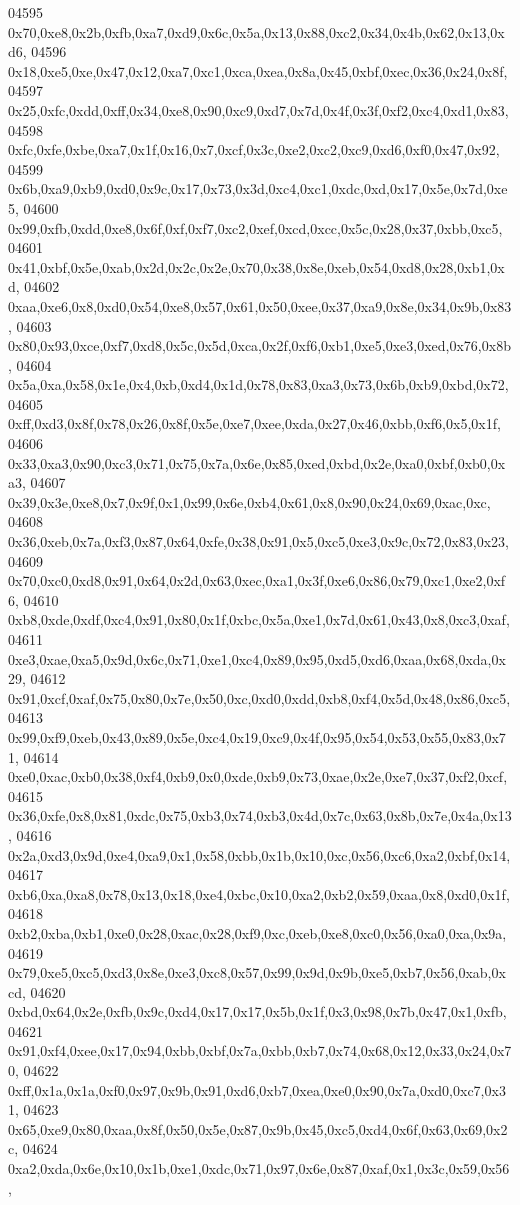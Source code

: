 \begin{DoxyCode}
04595   0x70,0xe8,0x2b,0xfb,0xa7,0xd9,0x6c,0x5a,0x13,0x88,0xc2,0x34,0x4b,0x62,0x13,0xd6,
04596   0x18,0xe5,0xe,0x47,0x12,0xa7,0xc1,0xca,0xea,0x8a,0x45,0xbf,0xec,0x36,0x24,0x8f,
04597   0x25,0xfc,0xdd,0xff,0x34,0xe8,0x90,0xc9,0xd7,0x7d,0x4f,0x3f,0xf2,0xc4,0xd1,0x83,
04598   0xfc,0xfe,0xbe,0xa7,0x1f,0x16,0x7,0xcf,0x3c,0xe2,0xc2,0xc9,0xd6,0xf0,0x47,0x92,
04599   0x6b,0xa9,0xb9,0xd0,0x9c,0x17,0x73,0x3d,0xc4,0xc1,0xdc,0xd,0x17,0x5e,0x7d,0xe5,
04600   0x99,0xfb,0xdd,0xe8,0x6f,0xf,0xf7,0xc2,0xef,0xcd,0xcc,0x5c,0x28,0x37,0xbb,0xc5,
04601   0x41,0xbf,0x5e,0xab,0x2d,0x2c,0x2e,0x70,0x38,0x8e,0xeb,0x54,0xd8,0x28,0xb1,0xd,
04602   0xaa,0xe6,0x8,0xd0,0x54,0xe8,0x57,0x61,0x50,0xee,0x37,0xa9,0x8e,0x34,0x9b,0x83,
04603   0x80,0x93,0xce,0xf7,0xd8,0x5c,0x5d,0xca,0x2f,0xf6,0xb1,0xe5,0xe3,0xed,0x76,0x8b,
04604   0x5a,0xa,0x58,0x1e,0x4,0xb,0xd4,0x1d,0x78,0x83,0xa3,0x73,0x6b,0xb9,0xbd,0x72,
04605   0xff,0xd3,0x8f,0x78,0x26,0x8f,0x5e,0xe7,0xee,0xda,0x27,0x46,0xbb,0xf6,0x5,0x1f,
04606   0x33,0xa3,0x90,0xc3,0x71,0x75,0x7a,0x6e,0x85,0xed,0xbd,0x2e,0xa0,0xbf,0xb0,0xa3,
04607   0x39,0x3e,0xe8,0x7,0x9f,0x1,0x99,0x6e,0xb4,0x61,0x8,0x90,0x24,0x69,0xac,0xc,
04608   0x36,0xeb,0x7a,0xf3,0x87,0x64,0xfe,0x38,0x91,0x5,0xc5,0xe3,0x9c,0x72,0x83,0x23,
04609   0x70,0xc0,0xd8,0x91,0x64,0x2d,0x63,0xec,0xa1,0x3f,0xe6,0x86,0x79,0xc1,0xe2,0xf6,
04610   0xb8,0xde,0xdf,0xc4,0x91,0x80,0x1f,0xbc,0x5a,0xe1,0x7d,0x61,0x43,0x8,0xc3,0xaf,
04611   0xe3,0xae,0xa5,0x9d,0x6c,0x71,0xe1,0xc4,0x89,0x95,0xd5,0xd6,0xaa,0x68,0xda,0x29,
04612   0x91,0xcf,0xaf,0x75,0x80,0x7e,0x50,0xc,0xd0,0xdd,0xb8,0xf4,0x5d,0x48,0x86,0xc5,
04613   0x99,0xf9,0xeb,0x43,0x89,0x5e,0xc4,0x19,0xc9,0x4f,0x95,0x54,0x53,0x55,0x83,0x71,
04614   0xe0,0xac,0xb0,0x38,0xf4,0xb9,0x0,0xde,0xb9,0x73,0xae,0x2e,0xe7,0x37,0xf2,0xcf,
04615   0x36,0xfe,0x8,0x81,0xdc,0x75,0xb3,0x74,0xb3,0x4d,0x7c,0x63,0x8b,0x7e,0x4a,0x13,
04616   0x2a,0xd3,0x9d,0xe4,0xa9,0x1,0x58,0xbb,0x1b,0x10,0xc,0x56,0xc6,0xa2,0xbf,0x14,
04617   0xb6,0xa,0xa8,0x78,0x13,0x18,0xe4,0xbc,0x10,0xa2,0xb2,0x59,0xaa,0x8,0xd0,0x1f,
04618   0xb2,0xba,0xb1,0xe0,0x28,0xac,0x28,0xf9,0xc,0xeb,0xe8,0xc0,0x56,0xa0,0xa,0x9a,
04619   0x79,0xe5,0xc5,0xd3,0x8e,0xe3,0xc8,0x57,0x99,0x9d,0x9b,0xe5,0xb7,0x56,0xab,0xcd,
04620   0xbd,0x64,0x2e,0xfb,0x9c,0xd4,0x17,0x17,0x5b,0x1f,0x3,0x98,0x7b,0x47,0x1,0xfb,
04621   0x91,0xf4,0xee,0x17,0x94,0xbb,0xbf,0x7a,0xbb,0xb7,0x74,0x68,0x12,0x33,0x24,0x70,
04622   0xff,0x1a,0x1a,0xf0,0x97,0x9b,0x91,0xd6,0xb7,0xea,0xe0,0x90,0x7a,0xd0,0xc7,0x31,
04623   0x65,0xe9,0x80,0xaa,0x8f,0x50,0x5e,0x87,0x9b,0x45,0xc5,0xd4,0x6f,0x63,0x69,0x2c,
04624   0xa2,0xda,0x6e,0x10,0x1b,0xe1,0xdc,0x71,0x97,0x6e,0x87,0xaf,0x1,0x3c,0x59,0x56,

\end{DoxyCode}
